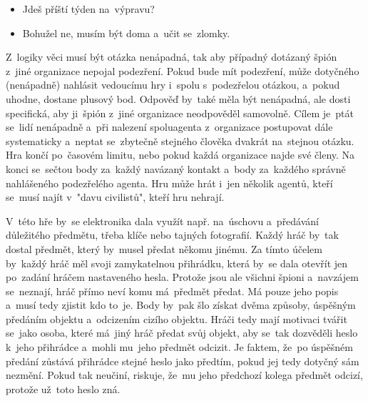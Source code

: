 \begin{itemize}
    \item Jdeš příští týden na~výpravu?
    \item Bohužel ne, musím být doma a~učit se~zlomky.
\end{itemize}
\vspace{5mm}

Z~logiky věci musí být otázka nenápadná, tak aby případný dotázaný špión z~jiné organizace nepojal podezření. 
Pokud bude mít podezření, může dotyčného (nenápadně) nahlásit vedoucímu hry i~spolu s~podezřelou otázkou, a~pokud uhodne, dostane plusový bod.
Odpověď by~také měla být nenápadná, ale dosti specifická, aby ji~špión z~jiné organizace neodpověděl samovolně.
Cílem je~ptát se~lidí nenápadně a~při nalezení spoluagenta z~organizace postupovat dále systematicky a~neptat se~zbytečně stejného člověka dvakrát na~stejnou otázku.
Hra končí po~časovém limitu, nebo pokud každá organizace najde své členy. 
Na konci se~sečtou body za~každý navázaný kontakt a~body za~každého správně nahlášeného podezřelého agenta.
Hru může hrát i~jen několik agentů, kteří se~musí najít v~"davu civilistů", kteří hru nehrají.

V~této hře by~se elektronika dala využít např. na~úschovu a~předávání důležitého předmětu, třeba klíče nebo tajných fotografií.
Každý hráč by~tak dostal předmět, který by~musel předat někomu jinému.
Za tímto účelem by~každý hráč měl svoji zamykatelnou přihrádku, která by~se dala otevřít jen po~zadání hráčem nastaveného hesla.
Protože jsou ale všichni špioni a~navzájem se~neznají, hráč přímo neví komu má~předmět předat.
Má pouze jeho popis a~musí tedy zjistit kdo to~je.
Body by~pak šlo získat dvěma způsoby, úspěšným předáním objektu a~odcizením cizího objektu.
Hráči tedy mají motivaci tvářit se~jako osoba, které má~jiný hráč předat svůj objekt, aby se~tak dozvěděli heslo k~jeho přihrádce a~mohli mu~jeho předmět odcizit.
Je faktem, že~po úspěšném předání zůstává přihrádce stejné heslo jako předtím, pokud jej tedy dotyčný sám nezmění.
Pokud tak neučiní, riskuje, že~mu jeho předchozí kolega předmět odcizí, protože už~toto heslo zná.


